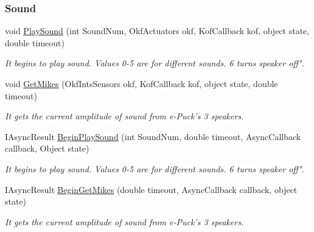 \subsubsection*{Sound} %
\label{ssub:Sound}
  \begin{DoxyCompactItemize}

  \item void \hyperlink{class_elib_1_1_epuck_a74acd305895e4f07920c45f8b29a8157}{PlaySound} (int SoundNum, OkfActuators okf, KofCallback kof, object state, double timeout)
  \begin{DoxyCompactList}\small\item\em It begins to play sound. Values 0-\/5 are for different sounds. 6 turns speaker off". \item\end{DoxyCompactList}

  \item void \hyperlink{class_elib_1_1_epuck_a176a4a63393394a409220699635a9196}{GetMikes} (OkfIntsSensors okf, KofCallback kof, object state, double timeout)
  \begin{DoxyCompactList}\small\item\em It gets the current amplitude of sound from e-\/Puck's 3 speakers. \item\end{DoxyCompactList}

  \item   IAsyncResult \hyperlink{class_elib_1_1_epuck_a2426a9ea921c131b8349204f477121f5}{BeginPlaySound} (int SoundNum, double timeout, AsyncCallback callback, Object state)
  \begin{DoxyCompactList}\small\item\em It begins to play sound. Values 0-\/5 are for different sounds. 6 turns speaker off". \item\end{DoxyCompactList}

  \item  IAsyncResult \hyperlink{class_elib_1_1_epuck_af69a96d43cc6d5c47960061312d1937b}{BeginGetMikes} (double timeout, AsyncCallback callback, object state)
  \begin{DoxyCompactList}\small\item\em It gets the current amplitude of sound from e-\/Puck's 3 speakers. \item\end{DoxyCompactList}

  \end{DoxyCompactItemize}

